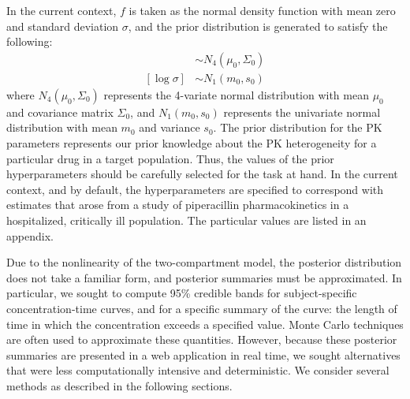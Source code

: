 \documentclass{article}\usepackage[]{graphicx}\usepackage[]{color}
\begin{document}
In the current context, $f$ is taken as the normal density function with mean zero and standard deviation $\sigma$, and the prior distribution is generated to satisfy the following:
\begin{align}
[\log \theta_i] &\sim N_4(\mu_0, \Sigma_0) \\
[\log \sigma] &\sim N_1(m_0, s_0)
\end{align}
\noindent where $N_4(\mu_0, \Sigma_0)$ represents the 4-variate normal distribution with mean $\mu_0$ and covariance matrix $\Sigma_0$, and $N_1(m_0, s_0)$ represents the univariate normal distribution with mean $m_0$ and variance $s_0$. The prior distribution for the PK parameters represents our prior knowledge about the PK heterogeneity for a particular drug in a target population. Thus, the values of the prior hyperparameters should be carefully selected for the task at hand. In the current context, and by default, the hyperparameters are specified to correspond with estimates that arose from a study of piperacillin pharmacokinetics in a hospitalized, critically ill population. The particular values are listed in an appendix.

Due to the nonlinearity of the two-compartment model, the posterior distribution does not take a familiar form, and posterior summaries must be approximated. In particular, we sought to compute 95\% credible bands for subject-specific concentration-time curves, and for a specific summary of the curve: the length of time in which the concentration exceeds a specified value. Monte Carlo techniques are often used to approximate these quantities. However, because these posterior summaries are presented in a web application in real time, we sought alternatives that were less computationally intensive and deterministic. We consider several methods as described in the following sections.
\end{document}
